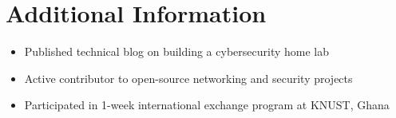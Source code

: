 \documentclass[a4paper,10pt]{article}
\begin{document}
\section{Additional Information}
\begin{itemize}[leftmargin=*]
    \item Published technical blog on building a cybersecurity home lab
    \item Active contributor to open-source networking and security projects
    \item Participated in 1-week international exchange program at KNUST, Ghana
\end{itemize}
\end{document}
